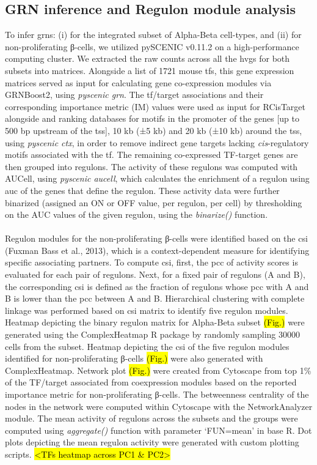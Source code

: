 \subsection{GRN inference and Regulon module analysis}
To infer \glspl{grn}: (i) for the integrated subset of Alpha-Beta cell-types, and (ii) for non-proliferating β-cells, we utilized pySCENIC v0.11.2 on a high-performance computing cluster. We extracted the raw counts across all the \glspl{hvg} for both subsets into matrices. Alongside a list of 1721 mouse \glspl{tf}, this gene expression matrices served as input for calculating gene co-expression modules via GRNBoost2, using \textit{pyscenic grn}. The \gls{tf}/target associations and their corresponding importance metric (IM) values were used as input for RCisTarget alongside and ranking databases for motifs in the promoter of the genes [up to 500 \gls{bp} upstream of the \gls{tss}], 10 kb (±5 kb) and 20 kb (±10 kb) around the \gls{tss}, using \textit{pyscenic ctx}, in order to remove indirect gene targets lacking \textit{cis}-regulatory motifs associated with the \gls{tf}. The remaining co-expressed TF-target genes are then grouped into regulons. The activity of these regulons was computed with AUCell, using \textit{pyscenic aucell}, which calculates the enrichment of a regulon using \gls{auc} of the genes that define the regulon. These activity data were further binarized (assigned an ON or OFF value, per regulon, per cell) by thresholding on the AUC values of the given regulon, using the \textit{binarize()} function.\\\\
Regulon modules for the non-proliferating β-cells were identified based on the \gls{csi} (Fuxman Bass et al., 2013), which is a context-dependent measure for identifying specific associating partners. To compute \gls{csi}, first, the \gls{pcc} of activity scores is evaluated for each pair of regulons. Next, for a fixed pair of regulons (A and B), the corresponding \gls{csi} is defined as the fraction of regulons whose \gls{pcc} with A and B is lower than the \gls{pcc} between A and B. Hierarchical clustering with complete linkage was performed based on \gls{csi} matrix to identify five regulon modules.\\


Heatmap depicting the binary regulon matrix for Alpha-Beta subset \hl{(Fig.)} were generated using the ComplexHeatmap R package by randomly sampling 30000 cells from the subset. Heatmap depicting the \gls{csi} of the five regulon modules identified for non-proliferating β-cells \hl{(Fig.)} were also generated with ComplexHeatmap.  Network plot \hl{(Fig.)} were created from Cytoscape from top 1\%  of the TF/target associated from coexpression modules based on the reported importance metric for non-proliferating β-cells. The betweenness centrality of the nodes in the network were computed within Cytoscape with the NetworkAnalyzer module. The mean activity of regulons across the subsets and the groups were computed using \textit{aggregate()} function with parameter `FUN=mean' in base R. Dot plots depicting the mean regulon activity were generated with custom plotting scripts.  \hl{<TFs heatmap across PC1 \& PC2>}



